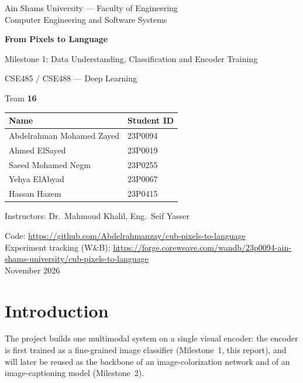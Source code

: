 \documentclass[11pt,a4paper]{article}
\begin{document}
\begin{titlepage}
\centering
{\large Ain Shams University --- Faculty of Engineering\\ Computer Engineering and Software Systems\par}
\vspace{2cm}
{\Huge\bfseries From Pixels to Language\par}
\vspace{0.4cm}
{\Large Milestone 1: Data Understanding, Classification and Encoder Training\par}
\vspace{0.4cm}
{\large CSE485 / CSE488 --- Deep Learning\par}
\vspace{1.5cm}
{\large Team \textbf{16}\par}
\vspace{0.6cm}
\begin{tabular}{ll}
\toprule
Name & Student ID \\
\midrule
Abdelrahman Mohamed Zayed & 23P0094 \\
Ahmed ElSayed & 23P0019 \\
Saeed Mohamed Negm & 23P0255 \\
Yehya ElAbyad & 23P0067 \\
Hassan Hazem & 23P0415 \\
\bottomrule
\end{tabular}
\vfill
{\large Instructors: Dr.\ Mahmoud Khalil, Eng.\ Seif Yasser\par}
\vspace{0.4cm}
{\small Code: \url{https://github.com/Abdelrahmanzay/cub-pixels-to-language}\\
Experiment tracking (W\&B): \url{https://forge.coreweave.com/wandb/23p0094-ain-shams-university/cub-pixels-to-language}}\\
\vspace{0.4cm}
November 2026
\end{titlepage}

\setcounter{tocdepth}{2}
{\small\tableofcontents}
\newpage

\section{Introduction}
The project builds one multimodal system on a single visual encoder: the encoder is first trained
as a fine-grained image classifier (Milestone~1, this report), and will later be reused as the
backbone of an image-colorization network and of an image-captioning model (Milestone~2).
\end{document}
